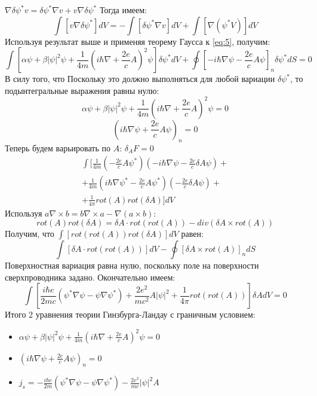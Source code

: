 \documentclass[a4paper]{article}
\begin{document}
$\nabla\delta\psi^*v=\delta\psi^*\nabla v+v\nabla\delta\psi^*$
Тогда имеем:
$$ \int[v\nabla\delta\psi^*]dV=-\int[\delta\psi^*\nabla v]dV+\int[\nabla(\psi^*V)]dV $$
Используя результат выше и применяя теорему Гаусса к \ref{eq:5}, получим:
\begin{equation} \label{eq:7}
\int[\alpha\psi+\beta|\psi|^2\psi+\frac{1}{4m}(i\hbar\nabla+\frac{2e}{c}A)^2\psi]\delta\psi^* dV + \oint[-i\hbar\nabla\psi-\frac{2e}{c}A\psi]_n\delta\psi^* dS = 0
\end{equation}
В силу того, что 
Поскольку это должно выполняться для любой вариации $\delta\psi^*$, то подынтегральные выражения равны нулю:
\begin{equation} \label{eq:8}
\alpha\psi+\beta|\psi|^2\psi+\frac{1}{4m}(i\hbar\nabla+\frac{2e}{c}A)^2\psi=0
\end{equation}
\begin{equation} \label{eq:9}
(i\hbar\nabla\psi+\frac{2e}{c}A\psi)_n=0    
\end{equation}
Теперь будем варьировать по $A$:
$\delta_A F=0$
\begin{multline}\label{eq:10}
\int[\frac{1}{4m}(-\frac{2e}{c}A\psi^*)(-i\hbar\nabla\psi-\frac{2e}{c}\delta A\psi)+ \\
+\frac{1}{4m}(i\hbar\nabla\psi^*-\frac{2e}{c}A\psi^*)(-\frac{2e}{c}\delta A\psi)+ \\
+\frac{1}{4\pi}rot(A)rot(\delta A)] d V
\end{multline}
Используя $a\nabla\times b=b\nabla\times a-\nabla(a\times b)$:
\begin{equation} \label{eq:11}
rot(A)rot(\delta A) = \delta A \cdot rot(rot(A))-div(\delta A\times rot(A))
\end{equation}
Получим, что $\int[rot(rot(A))rot(\delta A)]dV$ равен:
\begin{equation} \label{eq:12}
\int[\delta A \cdot rot(rot(A))]dV - \oint[\delta A\times rot(A)]_ndS
\end{equation}
Поверхностная вариация равна нулю, поскольку поле на поверхности сверхпроводника задано.
\newpage
Окончательно имеем:
\begin{equation} \label{eq:13}
\int[\frac{i\hbar e}{2mc}(\psi^*\nabla\psi-\psi\nabla\psi^*)+\frac{2e^2}{mc^2}A|\psi|^2+\frac{1}{4\pi}rot(rot(A))]\delta AdV=0
\end{equation}
Итого 2 уравнения теории Гинзбурга-Ландау с граничным условием:
\begin{itemize}
    \item  $\alpha\psi+\beta|\psi|^2\psi+\frac{1}{4m}(i\hbar\nabla+\frac{2e}{c}A)^2\psi=0$
    \item $(i\hbar\nabla\psi+\frac{2e}{c}A\psi)_n=0$
    \item $j_s=-\frac{i\hbar e}{2m}(\psi^*\nabla\psi-\psi\nabla\psi^*)-\frac{2e^2}{mc}|\psi|^2A$
\end{itemize}
\end{document}
